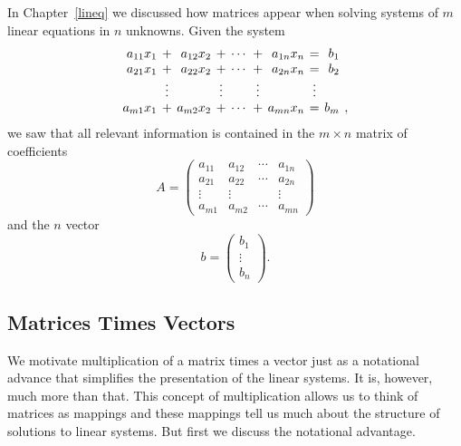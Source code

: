 In Chapter~\ref{lineq} we discussed how matrices appear when solving systems 
of $m$ linear equations in $n$ unknowns.  Given the system
\begin{equation}   \label{general2}
\arraycolsep 2pt
\begin{array}{rcrcrcrcrl}
a_{11}x_1 & + & a_{12}x_2 & + & \cdots & + & a_{1n}x_n & = & b_1 & \\
a_{21}x_1 & + & a_{22}x_2 & + & \cdots & + & a_{2n}x_n & = & b_2 & \\
    & \vdots &      & \vdots &    & \vdots &     & \vdots &   & \\
a_{m1}x_1 & + & a_{m2}x_2 & + & \cdots & + & a_{mn}x_n & = & b_m & ,
\end{array}
\end{equation}
we saw that all relevant information is contained in the $m\times n$ matrix 
of coefficients
\[
A=\left(
\begin{array}{rrrr}
 a_{11} & a_{12} & \cdots & a_{1n} \\
 a_{21} & a_{22} & \cdots & a_{2n}  \\
 \vdots & \vdots &        & \vdots  \\
 a_{m1} & a_{m2} & \cdots & a_{mn}
\end{array}
\right)
\]
and the $n$ vector
\[
b=\left(
\begin{array}{c}
b_1 \\ \vdots \\ b_n
\end{array}
\right).
\]



\subsection*{Matrices Times Vectors}

We motivate multiplication of a matrix times a vector just as a notational 
advance that simplifies the
presentation of the linear systems.  It is, however, much more
than that.  This concept of multiplication allows us to think of
matrices as mappings and these mappings tell us much about the
structure of solutions to linear systems.  But first we discuss
the notational advantage.

